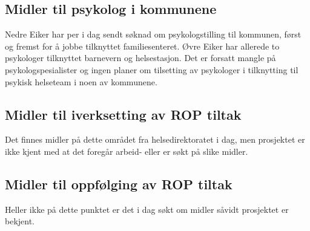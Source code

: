 \documentclass[11pt]{report} %
\begin{document}
                  \subsection{Midler til psykolog i kommunene}\label{sec:vv_mid_psyk}
                    Nedre Eiker har per i dag sendt søknad om psykologstilling til kommunen, først og fremst for å jobbe tilknyttet familiesenteret. Øvre Eiker har allerede to psykologer tilknyttet barnevern og helsestasjon. Det er forsatt mangle på psykologspesialister og ingen planer om tilsetting av psykologer i tilknytting til psykisk helseteam i noen av kommunene.
                  \subsection{Midler til iverksetting av ROP tiltak}\label{sec:vv_mid_iverksetting_ROP}
                    Det finnes midler på dette området fra helsedirektoratet i dag, men prosjektet er ikke kjent med at det foregår arbeid- eller er søkt på slike midler.
                  \subsection{Midler til oppfølging av ROP tiltak}\label{sec:vv_mid_oppf_ROP}
                    Heller ikke på dette punktet er det i dag søkt om midler såvidt prosjektet er bekjent. 
\end{document}
